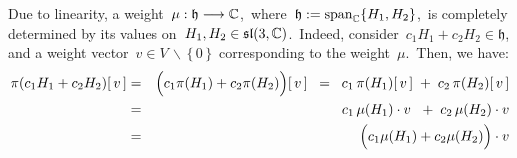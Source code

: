 
\vskip 0.5cm
\begin{remark}
\mbox{}
\vskip 0.1cm
\noindent
Due to linearity, a weight \,$\mu : \mathfrak{h} \longrightarrow \mathbb{C}$,\,
where \,$\mathfrak{h} := \textnormal{span}_{\mathbb{C}}\{H_{1},H_{2}\}$,\,
is completely determined by its values on \,$H_{1}, H_{2} \in \mathfrak{sl}(3,\mathbb{C})$.\,
Indeed, consider \,$c_{1} H_{1} + c_{2} H_{2} \in \mathfrak{h}$,\, and a weight vector
\,$v \in V\,\backslash\,\{\,0\,\}$\, corresponding to the weight \,$\mu$.\,
Then, we have:
\begin{eqnarray*}
\pi(c_{1}H_{1}+c_{2}H_{2})\!\left[\,v\,\right]
& = &
    \left(c_{1}\pi(H_{1}) \overset{{\color{white}.}}{+} c_{2}\pi(H_{2})\right)\!\left[\,v\,\right]
\;\; = \;\;
    c_{1}\,\pi(H_{1})\!\left[\,v\,\right] \;+\; c_{2}\,\pi(H_{2})\!\left[\,v\,\right]
\\
& = &
    c_{1}\,\mu(H_{1})\cdot v\ \;+\; c_{2}\,\mu(H_{2})\cdot v
\\
& = &
    \left(c_{1}\mu(H_{1}) \overset{{\color{white}.}}{+} c_{2}\mu(H_{2})\right)\cdot v
\end{eqnarray*}
\end{remark}



